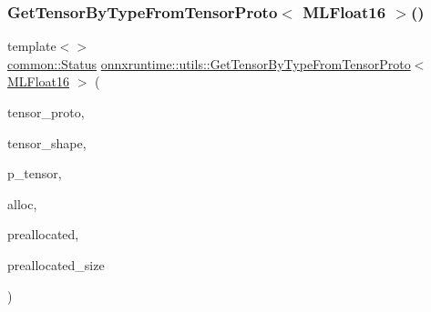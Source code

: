 \subsubsection{\texorpdfstring{Get\+Tensor\+By\+Type\+From\+Tensor\+Proto$<$ M\+L\+Float16 $>$()}{GetTensorByTypeFromTensorProto< MLFloat16 >()}}
{\footnotesize\ttfamily template$<$$>$ \\
\mbox{\hyperlink{classonnxruntime_1_1common_1_1Status}{common\+::\+Status}} \mbox{\hyperlink{namespaceonnxruntime_1_1utils_a4b262f6da83860e920ce90279a3fb400}{onnxruntime\+::utils\+::\+Get\+Tensor\+By\+Type\+From\+Tensor\+Proto}}$<$ \mbox{\hyperlink{uniononnxruntime_1_1MLFloat16}{M\+L\+Float16}} $>$ (\begin{DoxyParamCaption}\item[{const Tensor\+Proto \&}]{tensor\+\_\+proto,  }\item[{const \mbox{\hyperlink{classonnxruntime_1_1TensorShape}{Tensor\+Shape}} \&}]{tensor\+\_\+shape,  }\item[{std\+::unique\+\_\+ptr$<$ \mbox{\hyperlink{classonnxruntime_1_1Tensor}{Tensor}} $>$ $\ast$}]{p\+\_\+tensor,  }\item[{\mbox{\hyperlink{namespaceonnxruntime_a6cdac724c5dcefded3a63f08dae58fda}{Allocator\+Ptr}}}]{alloc,  }\item[{\mbox{\hyperlink{mlasi_8h_a88f941d423cb2a819b70a1358982b1a6}{void}} $\ast$}]{preallocated,  }\item[{\mbox{\hyperlink{mlasi_8h_a503efbc1c6e50825320ad909366b78ab}{size\+\_\+t}}}]{preallocated\+\_\+size }\end{DoxyParamCaption})}

\mbox{\label{namespaceonnxruntime_1_1utils_a732845e9a1ac398d4fd4d8968e3ebc1e}} 
